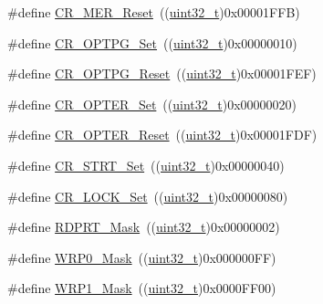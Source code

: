 \begin{DoxyCompactItemize}
\item 
\#define \hyperlink{group___f_l_a_s_h___private___defines_gabed855f33ff965c530c2b09a49a987f5}{C\+R\+\_\+\+M\+E\+R\+\_\+\+Reset}~((\hyperlink{_p_e___types_8h_a33594304e786b158f3fb30289278f5af}{uint32\+\_\+t})0x00001\+F\+F\+B)
\item 
\#define \hyperlink{group___f_l_a_s_h___private___defines_ga84ec77ffaa2a83edeef385e3a36171f8}{C\+R\+\_\+\+O\+P\+T\+P\+G\+\_\+\+Set}~((\hyperlink{_p_e___types_8h_a33594304e786b158f3fb30289278f5af}{uint32\+\_\+t})0x00000010)
\item 
\#define \hyperlink{group___f_l_a_s_h___private___defines_ga9dd2ca46f4e8edfa098e1481699c08b7}{C\+R\+\_\+\+O\+P\+T\+P\+G\+\_\+\+Reset}~((\hyperlink{_p_e___types_8h_a33594304e786b158f3fb30289278f5af}{uint32\+\_\+t})0x00001\+F\+E\+F)
\item 
\#define \hyperlink{group___f_l_a_s_h___private___defines_gac5707368555a5b7400eea1e306b62b16}{C\+R\+\_\+\+O\+P\+T\+E\+R\+\_\+\+Set}~((\hyperlink{_p_e___types_8h_a33594304e786b158f3fb30289278f5af}{uint32\+\_\+t})0x00000020)
\item 
\#define \hyperlink{group___f_l_a_s_h___private___defines_ga0245cfe194895f1ad98ba66f8eda3e47}{C\+R\+\_\+\+O\+P\+T\+E\+R\+\_\+\+Reset}~((\hyperlink{_p_e___types_8h_a33594304e786b158f3fb30289278f5af}{uint32\+\_\+t})0x00001\+F\+D\+F)
\item 
\#define \hyperlink{group___f_l_a_s_h___private___defines_ga0e6349818d8602ffffc56e5e04d9ab13}{C\+R\+\_\+\+S\+T\+R\+T\+\_\+\+Set}~((\hyperlink{_p_e___types_8h_a33594304e786b158f3fb30289278f5af}{uint32\+\_\+t})0x00000040)
\item 
\#define \hyperlink{group___f_l_a_s_h___private___defines_gaee27a8100366266daa8d3a69c589e4b9}{C\+R\+\_\+\+L\+O\+C\+K\+\_\+\+Set}~((\hyperlink{_p_e___types_8h_a33594304e786b158f3fb30289278f5af}{uint32\+\_\+t})0x00000080)
\item 
\#define \hyperlink{group___f_l_a_s_h___private___defines_gaa624b669116384b971b838ae201cad9f}{R\+D\+P\+R\+T\+\_\+\+Mask}~((\hyperlink{_p_e___types_8h_a33594304e786b158f3fb30289278f5af}{uint32\+\_\+t})0x00000002)
\item 
\#define \hyperlink{group___f_l_a_s_h___private___defines_ga79707964cbd409601e1ddf6064cf1c5c}{W\+R\+P0\+\_\+\+Mask}~((\hyperlink{_p_e___types_8h_a33594304e786b158f3fb30289278f5af}{uint32\+\_\+t})0x000000\+F\+F)
\item 
\#define \hyperlink{group___f_l_a_s_h___private___defines_gaa2b2535ba91736dd2d6baa92068686e0}{W\+R\+P1\+\_\+\+Mask}~((\hyperlink{_p_e___types_8h_a33594304e786b158f3fb30289278f5af}{uint32\+\_\+t})0x0000\+F\+F00)

\end{DoxyCompactItemize}
